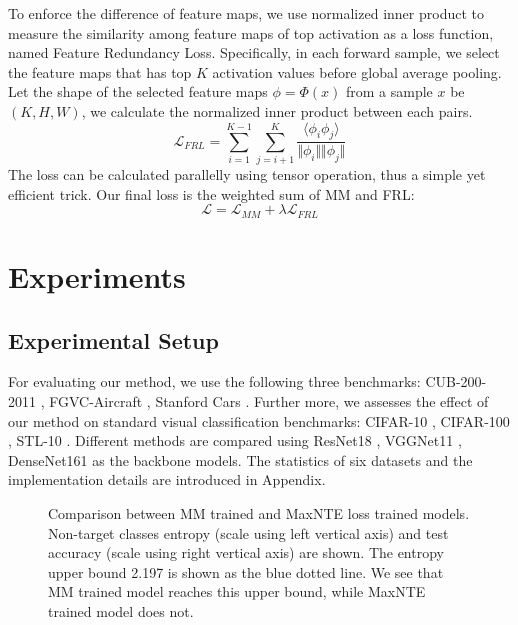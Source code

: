 \documentclass{article}
\theoremstyle{definition}
\begin{document}
To enforce the difference of feature maps, we use normalized inner product to measure the similarity among feature maps of top activation as a loss function, named Feature Redundancy Loss. Specifically, in each forward sample, we select the feature maps that has top $K$ activation values before global average pooling. Let the shape of the selected feature maps $\phi = \Phi(x)$ from a sample $x$ be $(K, H, W)$, we calculate the normalized inner product between each pairs.
\begin{equation}
     \mathcal{L}_{FRL} = \sum_{i=1}^{K-1}\sum_{j=i+1}^{K} \frac{\langle\phi_i\phi_j\rangle}{\Vert{\phi_i}\Vert\Vert{\phi_j}\Vert}
\end{equation}
The loss can be calculated parallelly using tensor operation, thus a simple yet efficient trick. Our final loss is the weighted sum of MM and FRL:
\begin{equation}
    \mathcal{L} = \mathcal{L}_{MM} + \lambda \mathcal{L}_{FRL}
\end{equation}

\section{Experiments}
\subsection{Experimental Setup}
For evaluating our method, we use the following three benchmarks: CUB-200-2011 \cite{wah2011caltech}, FGVC-Aircraft \cite{maji2013fine}, Stanford Cars \cite{KrauseStarkDengFei-Fei_3DRR2013}. Further more, we assesses the effect of our method on standard visual classification benchmarks: CIFAR-10 \cite{krizhevsky2009learning}, CIFAR-100 \cite{krizhevsky2009learning}, STL-10 \cite{coates2011analysis}. Different methods are compared using ResNet18 \cite{he2016deep}, VGGNet11 \cite{simonyan2014very}, DenseNet161 \cite{huang2017densely} as the backbone models. The statistics of six datasets and the implementation details are introduced in Appendix.

\begin{figure}[t]
    \centering
    \hspace{1mm}
    \caption{Comparison between MM trained and MaxNTE loss trained models. Non-target classes entropy (scale using left vertical axis) and test accuracy (scale using right vertical axis) are shown. The entropy upper bound 2.197 is shown as the blue dotted line. We see that MM trained model reaches this upper bound, while MaxNTE trained model does not.}
    \label{fig:comparison with MaxNTE}
\end{figure}
\end{document}
